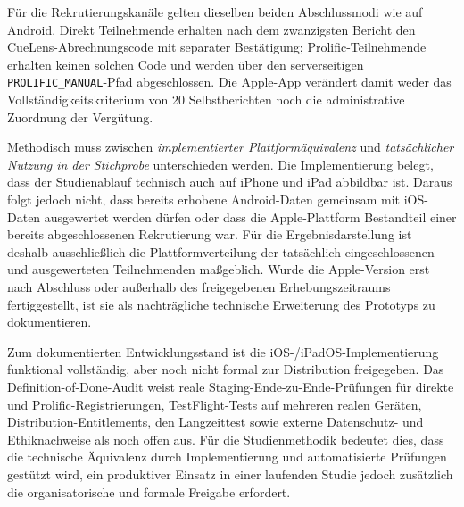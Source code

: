\begin{neu}
Für die Rekrutierungskanäle gelten dieselben beiden Abschlussmodi wie auf Android. Direkt Teilnehmende erhalten nach dem zwanzigsten Bericht den CueLens-Abrechnungscode mit separater Bestätigung; Prolific-Teilnehmende erhalten keinen solchen Code und werden über den serverseitigen \texttt{PROLIFIC\_MANUAL}-Pfad abgeschlossen. Die Apple-App verändert damit weder das Vollständigkeitskriterium von 20 Selbstberichten noch die administrative Zuordnung der Vergütung.

Methodisch muss zwischen \emph{implementierter Plattformäquivalenz} und \emph{tatsächlicher Nutzung in der Stichprobe} unterschieden werden. Die Implementierung belegt, dass der Studienablauf technisch auch auf iPhone und iPad abbildbar ist. Daraus folgt jedoch nicht, dass bereits erhobene Android-Daten gemeinsam mit iOS-Daten ausgewertet werden dürfen oder dass die Apple-Plattform Bestandteil einer bereits abgeschlossenen Rekrutierung war. Für die Ergebnisdarstellung ist deshalb ausschließlich die Plattformverteilung der tatsächlich eingeschlossenen und ausgewerteten Teilnehmenden maßgeblich. Wurde die Apple-Version erst nach Abschluss oder außerhalb des freigegebenen Erhebungszeitraums fertiggestellt, ist sie als nachträgliche technische Erweiterung des Prototyps zu dokumentieren.

Zum dokumentierten Entwicklungsstand ist die iOS-/iPadOS-Implementierung funktional vollständig, aber noch nicht formal zur Distribution freigegeben. Das Definition-of-Done-Audit weist reale Staging-Ende-zu-Ende-Prüfungen für direkte und Prolific-Registrierungen, TestFlight-Tests auf mehreren realen Geräten, Distribution-Entitlements, den Langzeittest sowie externe Datenschutz- und Ethiknachweise als noch offen aus. Für die Studienmethodik bedeutet dies, dass die technische Äquivalenz durch Implementierung und automatisierte Prüfungen gestützt wird, ein produktiver Einsatz in einer laufenden Studie jedoch zusätzlich die organisatorische und formale Freigabe erfordert.
\end{neu}
